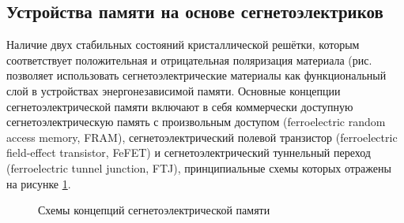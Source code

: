 \subsection{Устройства памяти на основе сегнетоэлектриков}
Наличие двух стабильных состояний кристаллической решётки, которым соответствует положительная и отрицательная поляризация материала (рис. позволяет использовать сегнетоэлектрические материалы как функциональный слой в устройствах энергонезависимой памяти. Основные концепции сегнетоэлектрической памяти включают в себя коммерчески доступную сегнетоэлектрическую память с произвольным доступом (ferroelectric random access memory, FRAM), сегнетоэлектрический полевой транзистор (ferroelectric field-effect transistor, FeFET) и сегнетоэлектрический туннельный переход (ferroelectric tunnel junction, FTJ), принципиальные схемы которых отражены на рисунке \cref{fig:fram}.

\begin{figure}[ht]
    \caption{Схемы концепций сегнетоэлектрической памяти}\label{fig:fram}
\end{figure}

\FloatBarrier
